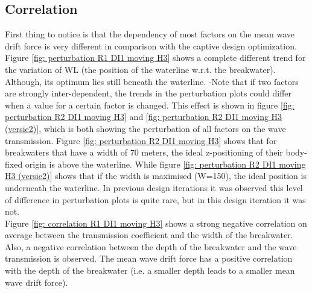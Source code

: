 \begin{table}[H]
\centering
{}
\caption{Boundaries Design Space Moving Design Iteration 1}
\label{tab: boundaries DI1 moving}
\end{table}


\subsection{Correlation}
\label{sec: correlation moving H3 DI1}

First thing to notice is that the dependency of most factors on the mean wave drift force is very different in comparison with the captive design optimization. Figure \ref{fig: perturbation R1 DI1 moving H3} shows a complete different trend for the variation of WL (the position of the waterline w.r.t. the breakwater). Although, its optimum lies still beneath the waterline. 
-Note that if two factors are strongly inter-dependent, the trends in the perturbation plots could differ when a value for a certain factor is changed. This effect is shown in figure \ref{fig: perturbation R2 DI1 moving H3} and \ref{fig: perturbation R2 DI1 moving H3 (versie2)}, which is both showing the perturbation of all factors on the wave transmission. Figure \ref{fig: perturbation R2 DI1 moving H3} shows that for breakwaters that have a width of 70 meters, the ideal z-positioning of their body-fixed origin is above the waterline. While figure \ref{fig: perturbation R2 DI1 moving H3 (versie2)} shows that if the width is maximised (W=150), the ideal position is underneath the waterline. In previous design iterations it was observed this level of difference in perturbation plots is quite rare, but in this design iteration it was not.\\
Figure \ref{fig: correlation R1 DI1 moving H3} shows a strong negative correlation on average between the transmission coefficient and the width of the breakwater. Also, a negative correlation between the depth of the breakwater and the wave transmission is observed. The mean wave drift force has a positive correlation with the depth of the breakwater (i.e. a smaller depth leads to a smaller mean wave drift force). 



